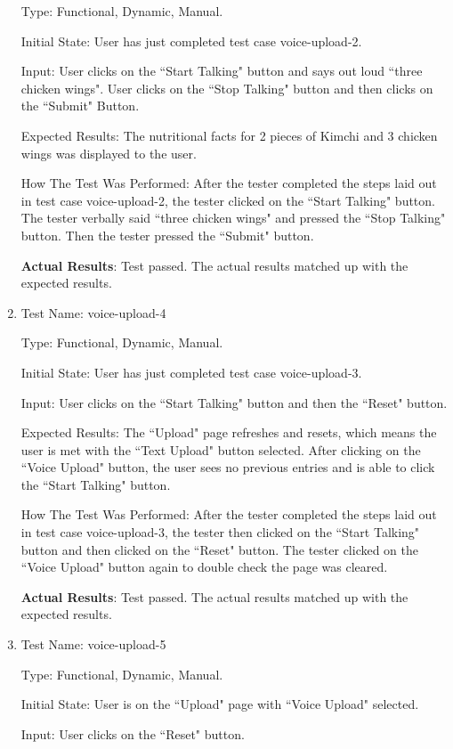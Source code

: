 \documentclass[12pt, titlepage]{article}
\begin{document}
\begin{enumerate}
		Type: Functional, Dynamic, Manual.
		
		Initial State: User has just completed test case voice-upload-2.
		
		Input: User clicks on the ``Start Talking" button and says out loud ``three chicken wings". User clicks on the ``Stop Talking" button and then clicks on the ``Submit" Button.
		
		Expected Results: The nutritional facts for 2 pieces of Kimchi and 3 chicken wings was displayed to the user.
		
		How The Test Was Performed: After the tester completed the steps laid out in test case voice-upload-2, the tester clicked on the ``Start Talking" button. The tester verbally said ``three chicken wings" and pressed the ``Stop Talking" button. Then the tester pressed the ``Submit" button.
		
		\textbf{Actual Results}: Test passed. The actual results matched up with the expected results.
		
		\item{Test Name: voice-upload-4}
		
		Type: Functional, Dynamic, Manual.
		
		Initial State: User has just completed test case voice-upload-3.
		
		Input: User clicks on the ``Start Talking" button and then the ``Reset" button.
		
		Expected Results: The ``Upload" page refreshes and resets, which means the user is met with the ``Text Upload" button selected. After clicking on the ``Voice Upload" button, the user sees no previous entries and is able to click the ``Start Talking" button.
		
		How The Test Was Performed: After the tester completed the steps laid out in test case voice-upload-3, the tester then clicked on the ``Start Talking" button and then clicked on the ``Reset" button. The tester clicked on the ``Voice Upload" button again to double check the page was cleared.
		
		\textbf{Actual Results}: Test passed. The actual results matched up with the expected results.
		
		\item{Test Name: voice-upload-5}
		
		Type: Functional, Dynamic, Manual.
		
		Initial State: User is on the ``Upload" page with ``Voice Upload" selected.
		
		Input: User clicks on the ``Reset" button.
		

\end{enumerate}
\end{document}
